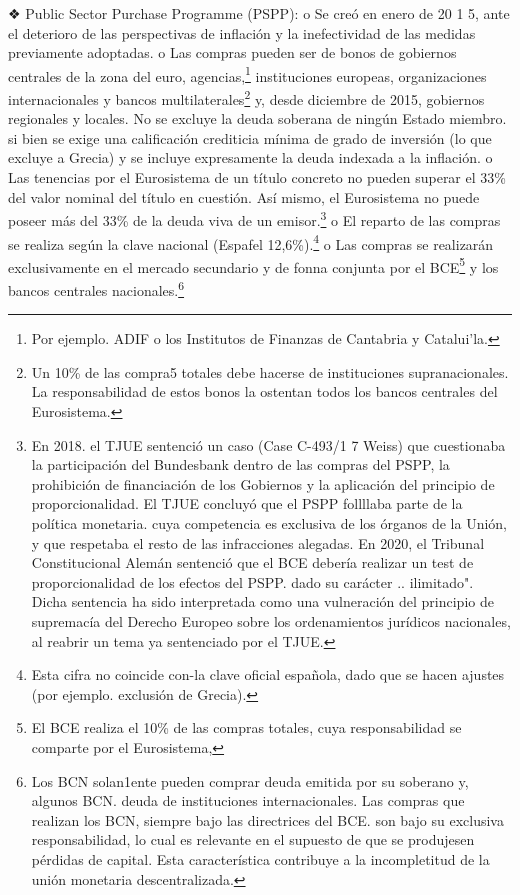 \documentclass[10pt,a4paper]{article}
\begin{document}
{❖ Public Sector Purchase Programme (PSPP): o Se creó en enero de 20 1 5, ante el deterioro de las perspectivas de inflación y la inefectividad de las medidas previamente adoptadas. o Las compras pueden ser de bonos de gobiernos centrales de la zona del euro, agencias,\footnote{Por ejemplo. ADIF o los Institutos de Finanzas de Cantabria y Catalui'la.
} instituciones europeas, organizaciones internacionales y bancos multilaterales\footnote{%
    Un 10\% de las compra5 totales debe hacerse de instituciones supranacionales. La responsabilidad de estos bonos la ostentan todos los bancos centrales del Eurosistema.
} y, desde diciembre de 2015, gobiernos regionales y locales. No se excluye la deuda soberana de ningún Estado miembro. si bien se exige una calificación crediticia mínima de grado de inversión (lo que excluye a Grecia) y se incluye expresamente la deuda indexada a la inflación. o Las tenencias por el Eurosistema de un título concreto no pueden superar el 33\% del valor nominal del título en cuestión. Así mismo, el Eurosistema no puede poseer más del 33\% de la deuda viva de un emisor.\footnote{%
    En 2018. el TJUE sentenció un caso (Case C-493/1 7 Weiss) que cuestionaba la participación del Bundesbank dentro de las compras del PSPP, la prohibición de financiación de los Gobiernos y la aplicación del principio de proporcionalidad. El TJUE concluyó que el PSPP follllaba parte de la política monetaria. cuya competencia es exclusiva de los órganos de la Unión, y que respetaba el resto de las infracciones alegadas. En 2020, el Tribunal Constitucional Alemán sentenció que el BCE debería realizar un test de proporcionalidad de los efectos del PSPP. dado su carácter .. ilimitado". Dicha sentencia ha sido interpretada como una vulneración del principio de supremacía del Derecho Europeo sobre los ordenamientos jurídicos nacionales, al reabrir un tema ya sentenciado por el TJUE.
} o El reparto de las compras se realiza según la clave nacional (Espaf\a el 12,6\%).\footnote{%
    Esta cifra no coincide con-la clave oficial española, dado que se hacen ajustes (por ejemplo. exclusión de Grecia).
} o Las compras se realizarán exclusivamente en el mercado secundario y de fonna conjunta por el BCE\footnote{%
    El BCE realiza el 10\% de las compras totales, cuya responsabilidad se comparte por el Eurosistema,
} y los bancos centrales nacionales.\footnote{%
    Los BCN solan1ente pueden comprar deuda emitida por su soberano y, algunos BCN. deuda de instituciones internacionales. Las compras que realizan los BCN, siempre bajo las directrices del BCE. son bajo su exclusiva responsabilidad, lo cual es relevante en el supuesto de que se produjesen pérdidas de capital. Esta característica contribuye a la incompletitud de la unión monetaria descentralizada.
}

}
\end{document}
